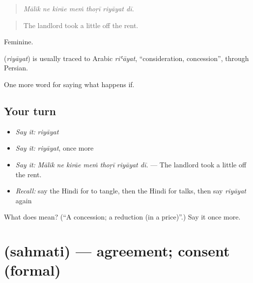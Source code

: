 \begin{quote}
      
\end{quote}

\begin{quote}
\emph{Mālik ne kirāe meṁ thoṛī riyāyat dī.}
\end{quote}

\begin{quote}
The landlord took a little off the rent.
\end{quote}

Feminine.

\begin{cousinweb}
\textbf{} (\emph{riyāyat}) is usually traced to Arabic \emph{riʿāyat}, \textquotedblleft{}consideration, concession\textquotedblright{}, through Persian.
\end{cousinweb}

\begin{grammarlens}[title={What you've built}]
One more word for saying what happens if.
\end{grammarlens}

\subsection*{Your turn}
\begin{itemize}
\raggedright
  \item \emph{Say it:} \emph{riyāyat}
  \item \emph{Say it:} \emph{riyāyat}, once more
  \item \emph{Say it:} \emph{Mālik ne kirāe meṁ thoṛī riyāyat dī.} — The landlord took a little off the rent.
  \item \emph{Recall:} say the Hindi for to tangle, then the Hindi for talks, then say \emph{riyāyat} again
\end{itemize}

\begin{tcolorbox}[breakable,colback=teal!4,colframe=teal!35!black,title={Before you move on}]
What does  mean? (\textquotedblleft{}A concession; a reduction (in a price)\textquotedblright{}.) Say it once more.
\end{tcolorbox}
\section[\texorpdfstring{\hi{सहमति} (sahmati)}{सहमति (sahmati)}]{ (sahmati) — agreement; consent (formal)}

